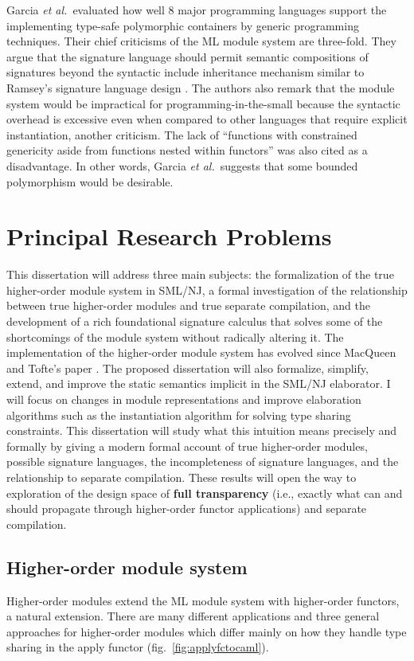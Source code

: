 \documentclass[12pt]{article}
\newcommand{\etal}{{\it et al.}}
\begin{document}
Garcia \etal\cite{garcia05:extendedcomparing05}~evaluated how well 8 major programming languages support the implementing type-safe polymorphic containers by generic programming techniques. 
Their chief criticisms of the ML module system are three-fold. They argue that the signature language should permit semantic compositions of signatures beyond the syntactic include inheritance mechanism similar to Ramsey's signature language design \cite{ramsey05}. The authors also remark that the module system would be impractical for programming-in-the-small because the syntactic overhead is excessive even when compared to other languages that require explicit instantiation, another criticism. The lack of ``functions with constrained genericity aside from functions nested within functors'' was also cited as a disadvantage. In other words, Garcia \etal~suggests that some bounded polymorphism would be desirable. 

\section{Principal Research Problems}
	This dissertation will address three main subjects: the formalization of the true higher-order module system in SML/NJ, a formal investigation of the relationship between true higher-order modules and true separate compilation, and the development of a rich foundational signature calculus that solves some of the shortcomings of the module system without radically altering it. The implementation of the higher-order module system has evolved since MacQueen and Tofte's paper \cite{mt94}. The proposed dissertation will also formalize, simplify, extend, and improve the static semantics implicit in the SML/NJ elaborator. I will focus on changes in module representations and improve elaboration algorithms such as the instantiation algorithm for solving type sharing constraints. This dissertation will study what this intuition means precisely and formally by giving a modern formal account of true higher-order modules, possible signature languages, the incompleteness of signature languages, and the relationship to separate compilation. These results will open the way to exploration of the design space of {\bf full transparency} (i.e., exactly what can and should propagate through higher-order functor applications) and separate compilation. 
	
\subsection{Higher-order module system}\label{sec:hofct}
	Higher-order modules extend the ML module system with higher-order functors, a natural extension. There are many different applications and three general approaches for higher-order modules \cite{tofte92,tofte:jfp94,mt94,biswas95,leroy95,Leroy:generativity,LillibridgeThesis,russothesis,dreyerthesis} which differ mainly on how they handle type sharing in the apply functor (fig.~\ref{fig:applyfctocaml}). 
\end{document}
